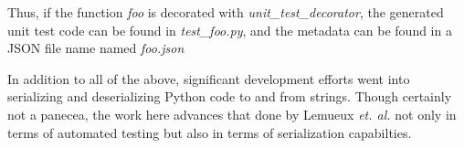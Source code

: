 Thus, if the function \textit{foo} is decorated with \textit{unit\_test\_decorator},
the generated unit test code can be found in \textit{test\_foo.py}, and the 
metadata can be found in a JSON file name named \textit{foo.json}

In addition to all of the above, significant development efforts went into 
serializing and deserializing Python code to and from strings.  Though
certainly not a panecea, the work here advances that done by 
Lemueux \textit{et. al.} \cite{lemieux2023codamosa} not only in terms of 
automated testing but also in terms of serialization capabilties.


